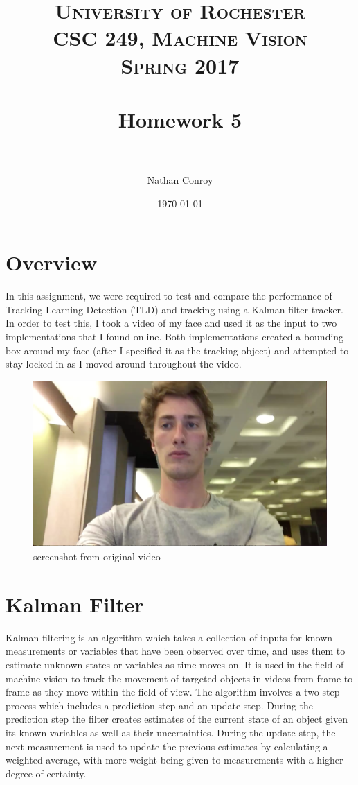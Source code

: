 \documentclass[paper=a4, fontsize=11pt]{scrartcl} %
\title{	
\normalfont \normalsize 
\textsc{University of Rochester\\CSC 249, Machine Vision\\Spring 2017} \\ [25pt] %
\horrule{0.5pt} \\[0.4cm] %
\huge Homework 5 \\ %
\horrule{2pt} \\[0.5cm] %
}
\author{Nathan Conroy} %
\date{\normalsize\today} %
\numberwithin{equation}{section} %
\numberwithin{figure}{section} %
\numberwithin{table}{section} %
\begin{document}
\maketitle %


\section{Overview}

In this assignment, we were required to test and compare the performance of Tracking-Learning Detection (TLD) and tracking using a Kalman filter tracker. In order to test this, I took a video of my face and used it as the input to two implementations that I found online. Both implementations created a bounding box around my face (after I specified it as the tracking object) and attempted to stay locked in as I moved around throughout the video.

\begin{figure}[H]
  \centering
  \begin{minipage}[b]{0.7\textwidth}
    \includegraphics[width=\textwidth]{original_1.png}
    \caption{screenshot from original video}
  \end{minipage}
\end{figure}

\section{Kalman Filter}

Kalman filtering is an algorithm which takes a collection of inputs for known measurements or variables that have been observed over time, and uses them to estimate unknown states or variables as time moves on. It is used in the field of machine vision to track the movement of targeted objects in videos from frame to frame as they move within the field of view. The algorithm involves a two step process which includes a prediction step and an update step. During the prediction step the filter creates estimates of the current state of an object given its known variables as well as their uncertainties. During the update step, the next measurement is used to update the previous estimates by calculating a weighted average, with more weight being given to measurements with a higher degree of certainty.
\end{document}
